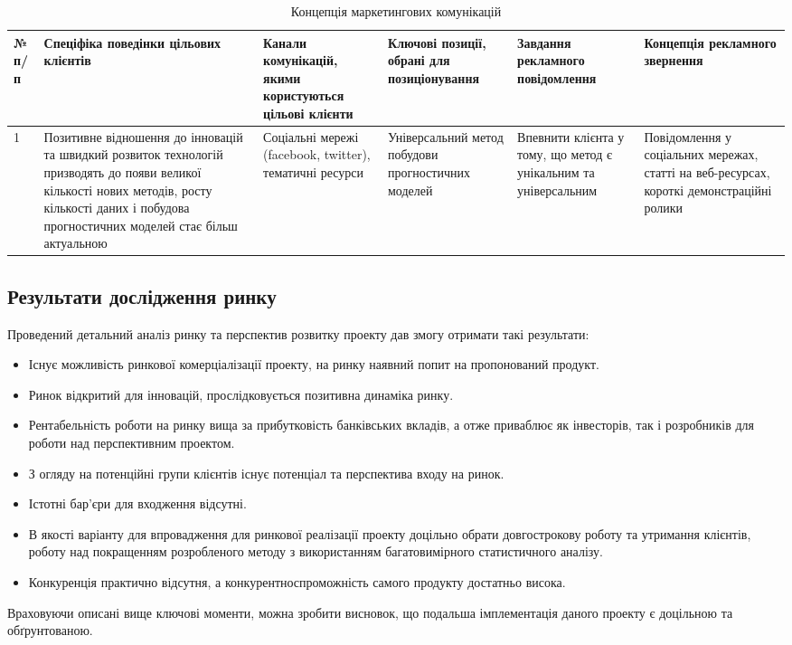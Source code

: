 \begin{table}[h!]
\fontsize{12pt}{12pt}\selectfont
	\begin{tabularx}{\textwidth}{|l|X|X|X|X|X|}
    \hline
    № п/п & Спеціфіка поведінки цільових клієнтів & Канали комунікацій, якими користуються цільові клієнти & Ключові позиції, обрані для позиціонування & Завдання рекламного повідомлення & Концепція рекламного звернення \\ \hline
    1 & Позитивне відношення до інновацій та швидкий розвиток технологій призводять до появи великої кількості нових методів, росту кількості даних і побудова прогностичних моделей стає більш актуальною & Соціальні мережі (facebook, twitter), тематичні ресурси & Універсальний метод побудови прогностичних моделей & Впевнити клієнта у тому, що метод є унікальним та універсальним & Повідомлення у соціальних мережах, статті на веб-ресурсах, короткі демонстраційні ролики \\
    \hline
    \end{tabularx}
\caption{Концепція маркетингових комунікацій} \label{tab:stab_16}
\end{table}

\subsection{Результати дослідження ринку}
Проведений детальний аналіз ринку та перспектив розвитку проекту дав змогу отримати такі результати:
\begin{itemize}  
	\item Існує можливість ринкової комерціалізації проекту, на ринку наявний попит на пропонований продукт.
	\item Ринок відкритий для інновацій, прослідковується позитивна динаміка ринку. 
	\item Рентабельність роботи на ринку вища за прибутковість банківських вкладів, а отже приваблює як інвесторів, так і розробників для роботи над перспективним проектом. 
	\item З огляду на потенційні групи клієнтів існує потенціал та перспектива входу на ринок. 
	\item Істотні бар'єри для входження відсутні.
	\item В якості варіанту для впровадження для ринкової реалізації проекту доцільно обрати довгострокову роботу та утримання клієнтів, роботу над покращенням розробленого методу з використанням багатовимірного статистичного аналізу.
	\item Конкуренція практично відсутня, а конкурентноспроможність самого продукту достатньо висока.
\end{itemize}
Враховуючи описані вище ключові моменти, можна зробити висновок, що подальша імплементація даного проекту є доцільною та обґрунтованою.
